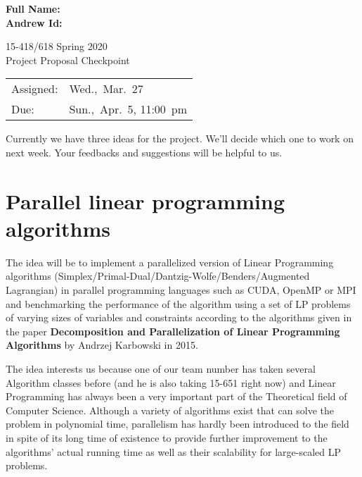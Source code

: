 \documentclass[11pt]{article}
\begin{document}
	\begin{flushright}
		{\large\bf Full Name: } \\[1ex]
		
		{\large\bf Andrew Id: } \\[1ex]
	\end{flushright}
	\vspace*{0.3in}
	\begin{center}
		\LARGE
		15-418/618 Spring 2020{} \\
		Project Proposal Checkpoint
		\\ 
	\end{center}
	
	\begin{center}
		\Large        
		\begin{tabular}{ll}
			\hline             
			Assigned: & Wed.,~Mar.~27  \\
			Due: &  Sun.,~Apr.~5, 11:00~pm  \\
			\hline       
		\end{tabular}
	\end{center} 

	Currently we have three ideas for the project. We'll decide which one to work on next week. Your feedbacks and suggestions will be helpful to us.
	
	\section{Parallel linear programming algorithms}
	The idea will be to implement a parallelized version of Linear Programming algorithms (Simplex/Primal-Dual/Dantzig-Wolfe/Benders/Augmented Lagrangian) in parallel programming languages such as CUDA, OpenMP or MPI and benchmarking the performance of the algorithm using a set of LP problems of varying sizes of variables and constraints according to the algorithms given in the paper \textbf{Decomposition and Parallelization of Linear Programming Algorithms} by Andrzej Karbowski in 2015.
	
	The idea interests us because one of our team number has taken several Algorithm classes before (and he is also taking 15-651 right now) and Linear Programming has always been a very important part of the Theoretical field of Computer Science. Although a variety of algorithms exist that can solve the problem in polynomial time, parallelism has hardly been introduced to the field in spite of its long time of existence to provide further improvement to the algorithms' actual running time as well as their scalability for large-scaled LP problems.
	
\end{document}
